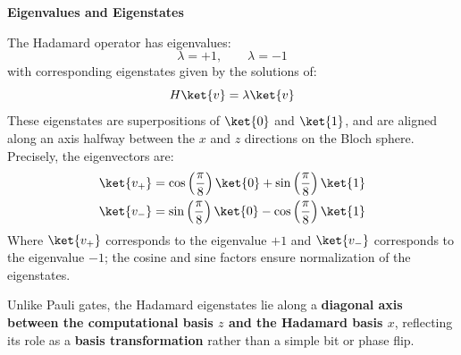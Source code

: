 \highspace
\begin{flushleft}
    \textcolor{Green3}{ \textbf{Eigenvalues and Eigenstates}}
\end{flushleft}
The Hadamard operator has eigenvalues:
\begin{equation*}
    \lambda = +1, \hspace{2em} \lambda = -1
\end{equation*}
with corresponding eigenstates given by the solutions of:
\begin{equation*}
    H\ket{v} = \lambda \ket{v}
\end{equation*}
These eigenstates are superpositions of $\ket{0}$ and $\ket{1}$, and are aligned along an axis halfway between the $x$ and $z$ directions on the Bloch sphere. Precisely, the eigenvectors are:
\begin{align*}
    \ket{v_{+}} &= \cos\left(\dfrac{\pi}{8}\right)\ket{0} + \sin\left(\dfrac{\pi}{8}\right)\ket{1} \\
    \ket{v_{-}} &= \sin\left(\dfrac{\pi}{8}\right)\ket{0} - \cos\left(\dfrac{\pi}{8}\right)\ket{1}
\end{align*}
Where $\ket{v_{+}}$ corresponds to the eigenvalue $+1$ and $\ket{v_{-}}$ corresponds to the eigenvalue $-1$; the cosine and sine factors ensure normalization of the eigenstates.

\highspace
Unlike Pauli gates, the Hadamard eigenstates lie along a \textbf{diagonal axis between the computational basis $z$ and the Hadamard basis $x$}, reflecting its role as a \textbf{basis transformation} rather than a simple bit or phase flip.

